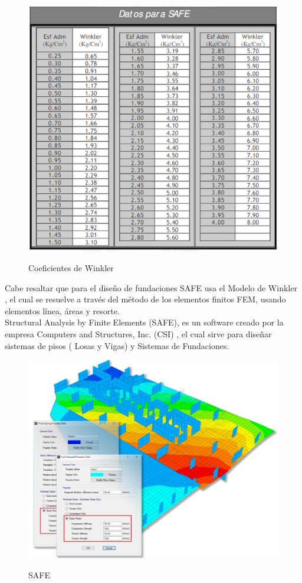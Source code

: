 \begin{figure}[h!]
    \centering
    \caption{Coeficientes de Winkler}
    \includegraphics[scale=1]{IMAGENES/safe3.PNG}
    \label{atrans}
\end{figure} 

Cabe resaltar que para el diseño de fundaciones SAFE usa el Modelo de Winkler , el cual se resuelve a través del método de los elementos finitos FEM, usando elementos línea, áreas y resorte.\\
Structural Analysis by Finite Elements (SAFE), es un software creado por la empresa Computers and Structures, Inc. (CSI) , el cual sirve para diseñar sistemas de pisos ( Losas y Vigas) y Sistemas de Fundaciones.
\begin{figure}[h!]
    \centering
    \caption{SAFE}
    \includegraphics[scale=0.3]{IMAGENES/33.jpg}
    \label{atrans}
\end{figure} 

